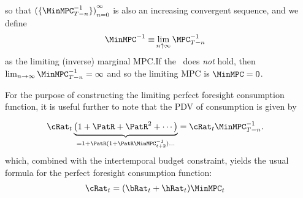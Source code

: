 \documentclass[\econtexRoot/BufferStockTheory]{subfiles}
\begin{document}
so that ${(\{\MinMPC_{T-n}^{-1}\})}_{n=0}^{\infty}$ is also an increasing
convergent sequence, and we define
\begin{equation}\begin{gathered}\begin{aligned}
\MinMPC^{-1} \equiv &\lim_{n \uparrow \infty} \MPC_{T-n}^{-1}  
\end{aligned}\end{gathered}\end{equation}
as the limiting (inverse) marginal MPC.\@  If the \RIC~does \textit{not} hold, then $\lim_{n \rightarrow \infty} \MinMPC_{T-n}^{-1} = \infty$
and so the limiting MPC is $\MinMPC = 0$.

For the purpose of constructing the limiting perfect foresight consumption function, it is useful further to note that
the PDV of consumption is given by\hypertarget{MPCnvrsIsCPDV}{}

\begin{eqnarray*}
  \cRat_{t}\underbrace{\left(1 + \PatR + \PatR^{2} + \cdots \right)}_{=1+\PatR(1+\PatR\MinMPC_{t+2}^{-1})\ldots}   & = \cRat_{t}\MinMPC_{T-n}^{-1}.
\end{eqnarray*}
which, combined with the intertemporal budget constraint, yields the usual formula for the perfect foresight consumption function:
\begin{equation}\begin{gathered}\begin{aligned}
  \cRat_{t} & = (\bRat_{t}+\hRat_{t})\MinMPC_{t}
\end{aligned}\end{gathered}\end{equation}
\end{document}
